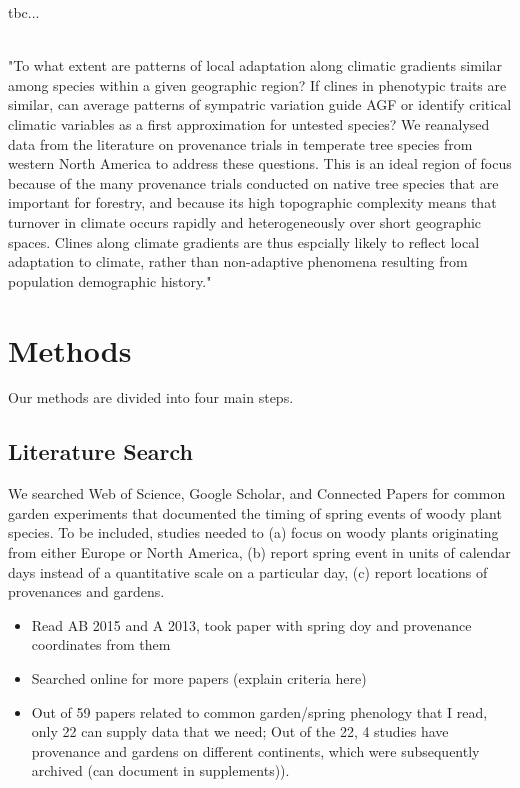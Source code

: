 \documentclass{article}
\begin{document}

tbc...

 
 

\citep{AitkenBemmels16}\\
"To what extent are patterns of local adaptation along climatic gradients similar among species within a given geographic region? If clines in phenotypic traits are similar, can average patterns of sympatric variation guide AGF or identify critical climatic variables as a first approximation for untested species? We reanalysed data from the literature on provenance trials in temperate tree species from western North America to address these questions. This is an ideal region of focus because of the many provenance trials conducted on native tree species that are important for forestry, and because its high topographic complexity means that turnover in climate occurs rapidly and heterogeneously over short geographic spaces. Clines along climate gradients are thus espcially likely to reflect local adaptation to climate, rather than non-adaptive phenomena resulting from population demographic history."
 




\section{Methods}
Our methods are divided into four main steps. 

\subsection{Literature Search}
We searched Web of Science, Google Scholar, and Connected Papers for common garden experiments that documented the timing of spring events of woody plant species. To be included, studies needed to (a) focus on woody plants originating from either Europe or North America, (b) report spring event in units of calendar days instead of a quantitative scale on a particular day, (c) report locations of provenances and gardens.  
  \begin{itemize}
\item Read AB 2015 and A 2013, took paper with spring doy and provenance coordinates from them
\item Searched online for more papers (explain criteria here)
\item Out of 59 papers related to common garden/spring phenology that I read, only 22 can supply data that we need; Out of the 22, 4 studies have provenance and gardens on different continents, which were subsequently archived (can document in supplements)).
\end{itemize}
\end{document}
